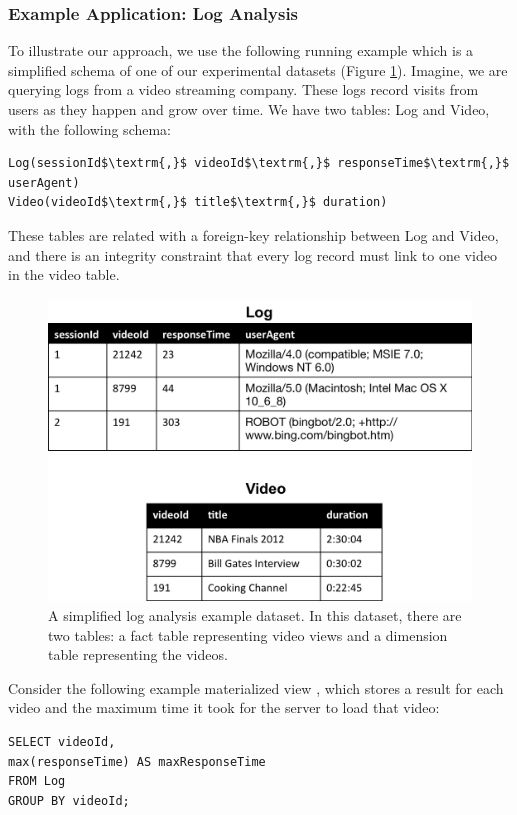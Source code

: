 \subsubsection{Example Application: Log Analysis}
To illustrate our approach, we use the following running example which is a 
simplified schema of one of our experimental datasets (Figure \ref{example}). 
Imagine, we are querying logs from a video streaming company. 
These logs record visits from users as they happen and grow over time.
We have two tables: Log and Video, with the following schema:



\begin{lstlisting}[mathescape]
Log(sessionId$\textrm{,}$ videoId$\textrm{,}$ responseTime$\textrm{,}$ userAgent)
Video(videoId$\textrm{,}$ title$\textrm{,}$ duration)
\end{lstlisting}
These tables are related with a foreign-key relationship between
Log and Video, and there is an integrity constraint that every log
record must link to one video in the video table.

\begin{figure}[h]
\label{example}
\centering
 \includegraphics[width=\columnwidth]{figs/sample-clean-example.png}
 \caption{A simplified log analysis example dataset. In this dataset, there are two tables: a fact table representing video views and a dimension table representing the videos.}
\end{figure}

Consider the following example materialized view \aggview, which stores a result for each video and the maximum time it took for the server to load that video:
\begin{lstlisting} 
SELECT videoId, 
max(responseTime) AS maxResponseTime 
FROM Log 
GROUP BY videoId;
\end{lstlisting}

